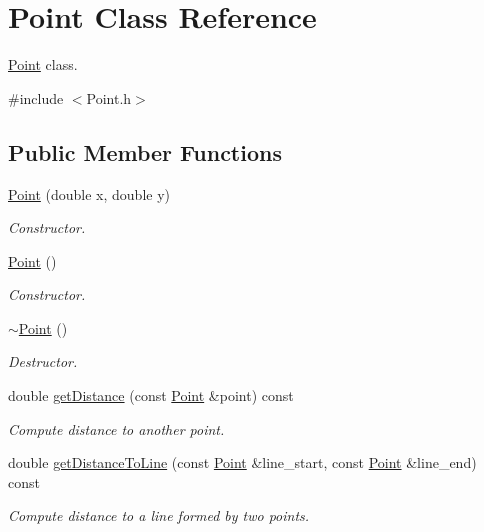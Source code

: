 \hypertarget{classPoint}{\section{Point Class Reference}
\label{classPoint}
}


\hyperlink{classPoint}{Point} class.  




{\ttfamily \#include $<$Point.\-h$>$}

\subsection*{Public Member Functions}
\begin{DoxyCompactItemize}
\item 
\hyperlink{classPoint_a78b55e8d5466bb8c2cf60fa55f2562ff}{Point} (double x, double y)
\begin{DoxyCompactList}\small\item\em Constructor. \end{DoxyCompactList}\item 
\hyperlink{classPoint_ad92f2337b839a94ce97dcdb439b4325a}{Point} ()
\begin{DoxyCompactList}\small\item\em Constructor. \end{DoxyCompactList}\item 
\hyperlink{classPoint_a395fa04b4ec126b66fc053f829a30cc1}{$\sim$\-Point} ()
\begin{DoxyCompactList}\small\item\em Destructor. \end{DoxyCompactList}\item 
double \hyperlink{classPoint_a945326d198e635f9fcd0c5828b1c74c3}{get\-Distance} (const \hyperlink{classPoint}{Point} \&point) const 
\begin{DoxyCompactList}\small\item\em Compute distance to another point. \end{DoxyCompactList}\item 
double \hyperlink{classPoint_ae16c6310ac1207f57370824f70e0a3f9}{get\-Distance\-To\-Line} (const \hyperlink{classPoint}{Point} \&line\-\_\-start, const \hyperlink{classPoint}{Point} \&line\-\_\-end) const 
\begin{DoxyCompactList}\small\item\em Compute distance to a line formed by two points. \end{DoxyCompactList}\item 

\end{DoxyCompactItemize}
